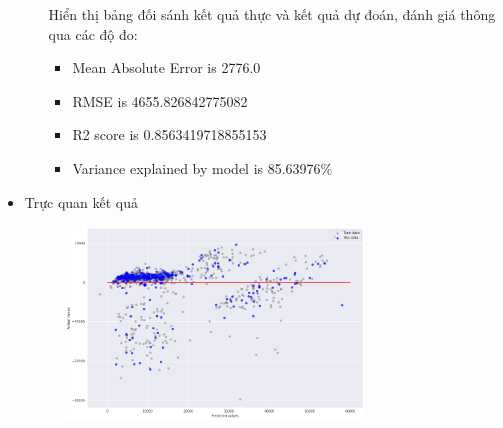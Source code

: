 \documentclass{article}
\begin{document}
\begin{itemize}
\begin{itemize}
\begin{figure}[H]
			\end{figure}
			Hiển thị bảng đối sánh kết quả thực và kết quả dự đoán, đánh giá thông qua các độ đo:
			\begin{itemize}
				\item Mean Absolute Error is  2776.0
				\item RMSE is 4655.826842775082
				\item R2 score is 0.8563419718855153
				\item Variance explained by model is 85.63976\%
			\end{itemize}
		\end{itemize}
		\item Trực quan kết quả
		\begin{figure}[H]
			\centering
			\includegraphics[width=0.75\textwidth]{images/polynomial_reg/poly_reg_plot.png}
		\end{figure}
	\end{itemize}
\end{document}
